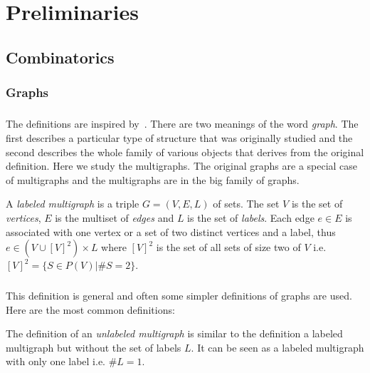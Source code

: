 \chapter{Preliminaries}
\label{Preliminaries}

\section{Combinatorics}
\subsection{Graphs}

\paragraph{}
The definitions are inspired by~\cite{diestel2017graph}. There are two meanings of the word \textit{graph}. The first  describes a particular type of structure that was originally studied and the second describes the whole family of various objects that derives from the original definition. Here we study the multigraphs. The original graphs are a special case of multigraphs and the multigraphs are in the big family of graphs.

\begin{definition}
  A \textit{labeled multigraph} is a triple $G = (V, E, L)$ of sets. The set $V$ is the set of \textit{vertices}, $E$ is the multiset of \textit{edges} and $L$ is the set of \textit{labels}. Each edge $e \in E$ is associated with one vertex or a set of two distinct vertices and a label, thus $e \in (V \cup [V]^2) \times L$ where $[V]^2$ is the set of all sets of size two of $V$ i.e. $[V]^2 = \{S \in P(V) | \#S = 2\}$.
\end{definition}

\paragraph{}
This definition is general and often some simpler definitions of graphs are used. Here are the most common definitions:

\begin{definition}
  The definition of an \textit{unlabeled multigraph} is similar to the definition a labeled multigraph but without the set of labels $L$. It can be seen as a labeled multigraph with only one label i.e. $\# L = 1$.
\end{definition}

